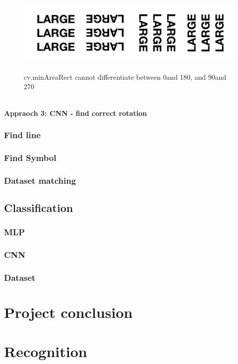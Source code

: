 \documentclass[11pt,a4paper,UKenglish]{article}
\begin{document}
\begin{figure}[H]
  \centering
  \includegraphics[height=4cm]{res/4angle_rot.png}
  \caption{cv.minAreaRect cannot differentiate between 0\textdegree and 180\textdegree, and 90\textdegree and 270\textdegree}
  \label{fig:4angle_rot}
\end{figure}


\noindent \\ \textbf{Appraoch 3: CNN - find correct rotation}
\noindent \\






\subsubsection{Find line}
\subsubsection{Find Symbol}
\subsubsection{Dataset matching}

\subsection{Classification}

\subsubsection{MLP}
\subsubsection{CNN}
\subsubsection{Dataset}


\section{Project conclusion}
\label{sec:Project conclusion}

\section{Recognition}
\label{sec:Recognition}




\end{document}
